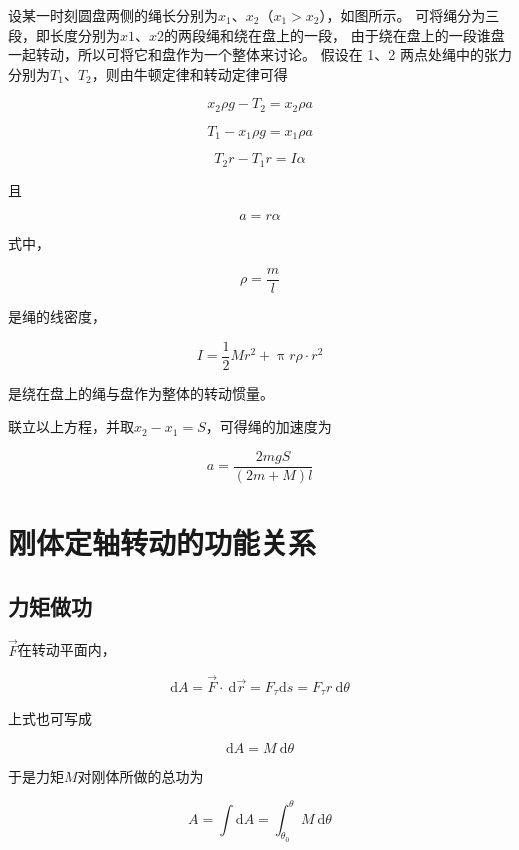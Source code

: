 \documentclass[12pt, a4paper]{article}
\numberwithin{equation}{section}
\newcommand{\rmd}{\mathrm{~d}}
\begin{document}
    设某一时刻圆盘两侧的绳长分别为\(x_1\)、\(x_2\)（\(x_1 > x_2\)），如图所示。
    可将绳分为三段，即长度分别为\(x1\)、\(x2\)的两段绳和绕在盘上的一段，
    由于绕在盘上的一段谁盘一起转动，所以可将它和盘作为一个整体来讨论。
    假设在 1、2 两点处绳中的张力分别为\(T_1\)、\(T_2\)，则由牛顿定律和转动定律可得

    \[
        x_2 \rho g - T_2 = x_2 \rho a
    \]

    \[
        T_1 - x_1 \rho g = x_1 \rho a
    \]

    \[
        T_2r - T_1r = I \alpha
    \]

    且

    \[
        a = r\alpha
    \]

    式中，

    \[
        \rho = \frac{m}{l}
    \]

    是绳的线密度，

    \[
        I = \frac{1}{2}Mr^2 + \uppi r \rho \cdot r^2
    \]

    是绕在盘上的绳与盘作为整体的转动惯量。

    联立以上方程，并取\(x_2-x_1=S\)，可得绳的加速度为

    $$
        a=\frac{2 m g S}{(2 m+M) l}
    $$

\section{刚体定轴转动的功能关系}

\subsection{力矩做功}

    \(\overrightarrow{F}\)在转动平面内，

    \begin{equation*}
        \mathrm{d} A=\overrightarrow{F} \cdot \mathrm{~d} \overrightarrow{r}=F_\tau \mathrm{d} s=F_\tau r \mathrm{~d} \theta
        \label{formula-4-3-1}
    \end{equation*}

    上式也可写成

    \begin{equation}
        \mathrm{d} A = M \rmd \theta
    \end{equation}

    于是力矩\(M\)对刚体所做的总功为

    \begin{equation}
        A=\int \mathrm{d} A=\int_{\theta_0}^\theta M \mathrm{~d} \theta
    \end{equation}
\end{document}
